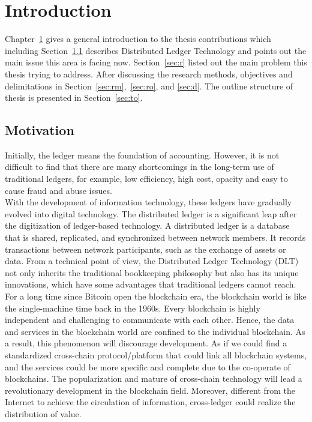\chapter{Introduction}
\label{chap:1}
\noindent Chapter~\ref{chap:1} gives a general introduction to the thesis contributions which including Section~\ref{sec:m} describes Distributed Ledger Technology and points out the main issue this area is facing now. Section~\ref{sec:r} listed out the main problem this thesis trying to address. After discussing the research methods, objectives and delimitations in Section~\ref{sec:rm},~\ref{sec:ro}, and \ref{sec:d}. The outline structure of thesis is presented in Section~\ref{sec:to}. 
\section{Motivation}
\label{sec:m}

\noindent Initially, the ledger means the foundation of accounting. However, it is not difficult to find that there are many shortcomings in the long-term use of traditional ledgers, for example, low efficiency, high cost, opacity and easy to cause fraud and abuse issues.\\

\noindent With the development of information technology, these ledgers have gradually evolved into digital technology. The distributed ledger is a significant leap after the digitization of ledger-based technology. A distributed ledger is a database that is shared, replicated, and synchronized between network members\cite{brakeville2016blockchain}. It records transactions between network participants, such as the exchange of assets or data. From a technical point of view, the Distributed Ledger Technology (DLT) not only inherits the traditional bookkeeping philosophy but also has its unique innovations, which have some advantages that traditional ledgers cannot reach.\\

\noindent For a long time since Bitcoin open the blockchain era, the blockchain world is like the single-machine time back in the 1960s. Every blockchain is highly independent and challenging to communicate with each other. Hence, the data and services in the blockchain world are confined to the individual blockchain. As a result, this phenomenon will discourage development. As if we could find a standardized cross-chain protocol/platform that could link all blockchain systems, and the services could be more specific and complete due to the co-operate of blockchains. The popularization and mature of cross-chain technology will lead a revolutionary development in the blockchain field. Moreover, different from the Internet to achieve the circulation of information, cross-ledger could realize the distribution of value.\\

